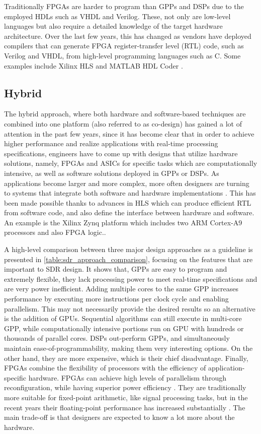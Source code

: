 Traditionally FPGAs are harder to program than GPPs and DSPs due to the employed HDLs such as VHDL and Verilog. These, not only are low-level languages but also require a detailed knowledge of the target hardware architecture. Over the last few years, this has changed as vendors have deployed compilers that can generate FPGA register-transfer level (RTL) code, such as Verilog and VHDL, from high-level programming languages such as C. Some examples include Xilinx HLS \cite{unknown-m} and MATLAB HDL Coder \cite{matlab-a} \cite{unknown-l}.

\subsection{Hybrid}

The hybrid approach, where both hardware and software-based techniques are combined into one platform (also referred to as co-design) has gained a lot of attention in the past few years, since it has become clear that in order to achieve higher performance and realize applications with real-time processing specifications, engineers have to come up with designs that utilize hardware solutions, namely, FPGAs and ASICs \cite{wolf2003a} \cite{micheli2001a} for specific tasks which are computationally intensive, as well as software solutions deployed in GPPs or DSPs. As applications become larger and more complex, more often designers are turning to systems that integrate both software and hardware implementations \cite{teich2012a}. This has been made possible thanks to advances in HLS which can produce efficient RTL from software code, and also define the interface between hardware and software. An example is the Xilinx Zynq platform \cite{unknown-k} which includes two ARM Cortex-A9 processors and also FPGA logic.\cite{unknown-p}.

A high-level comparison between three major design approaches as a guideline is presented in \autoref{table:sdr_approach_comparison}, focusing on the features that are important to SDR design. It shows that, GPPs are easy to program and extremely flexible, they lack processing power to meet real-time specifications and are very power inefficient. Adding multiple cores to the same GPP increases performance by executing more instructions per clock cycle and enabling parallelism. This may not necessarily provide the desired results so an alternative is the addition of GPUs. Sequential algorithms can still execute in multi-core GPP, while computationally intensive portions run on GPU with hundreds or thousands of parallel cores. DSPs out-perform GPPs, and simultaneously maintain ease-of-programmability, making them very interesting options. On the other hand, they are more expensive, which is their chief disadvantage. Finally, FPGAs combine the flexibility of processors with the efficiency of application-specific hardware. FPGAs can achieve high levels of parallelism through reconfiguration, while having superior power efficiency \cite{v2014a}. They are traditionally more suitable for fixed-point arithmetic, like signal processing tasks, but in the recent years their floating-point performance has increased substantially \cite{kestur2010a} \cite{underwood2004a}. The main trade-off is that designers are expected to know a lot more about the hardware.

